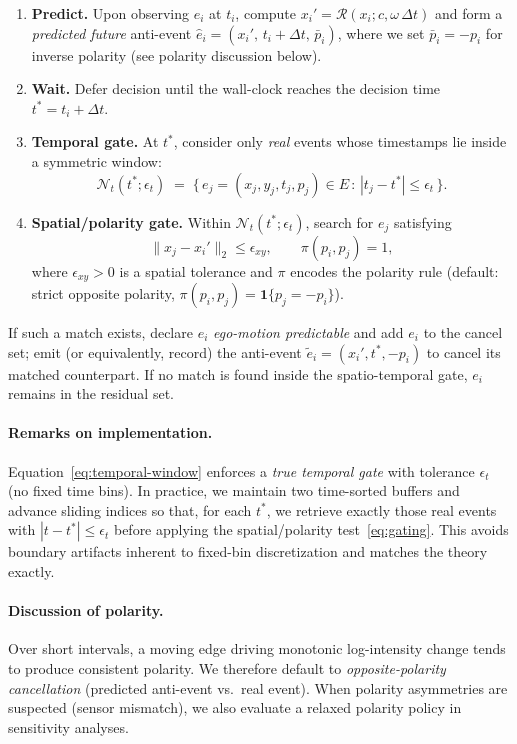 \begin{enumerate}
  \item \textbf{Predict.} Upon observing $e_i$ at $t_i$, compute $x_i'=\mathcal{R}(x_i; c, \omega\,\Delta t)$ and form a \emph{predicted future} anti-event $\hat e_i = (x_i',\, t_i+\Delta t,\, \bar p_i)$, where we set $\bar p_i=-p_i$ for inverse polarity (see polarity discussion below).
  \item \textbf{Wait.} Defer decision until the wall-clock reaches the decision time $t^* = t_i + \Delta t$.
  \item \textbf{Temporal gate.} At $t^*$, consider only \emph{real} events whose timestamps lie inside a symmetric window:
  \begin{equation}
  \mathcal{N}_t(t^*;\epsilon_t) \;=\; \{\, e_j=(x_j,y_j,t_j,p_j)\in E \,:\, |t_j - t^*| \le \epsilon_t \,\}.
  \label{eq:temporal-window}
  \end{equation}
  \item \textbf{Spatial/polarity gate.} Within $\mathcal{N}_t(t^*;\epsilon_t)$, search for $e_j$ satisfying
  \begin{equation}
  \|x_j - x_i'\|_2 \le \epsilon_{xy},
  \qquad
  \pi(p_i,p_j)=1,
  \label{eq:gating}
  \end{equation}
  where $\epsilon_{xy}>0$ is a spatial tolerance and $\pi$ encodes the polarity rule (default: strict opposite polarity, $\pi(p_i,p_j)=\mathbf{1}\{p_j=-p_i\}$).
\end{enumerate}

If such a match exists, declare $e_i$ \emph{ego-motion predictable} and add $e_i$ to the cancel set; emit (or equivalently, record) the anti-event $\tilde e_i=(x_i', t^*, -p_i)$ to cancel its matched counterpart. If no match is found inside the spatio-temporal gate, $e_i$ remains in the residual set.

\paragraph{Remarks on implementation.}
Equation~\eqref{eq:temporal-window} enforces a \emph{true temporal gate} with tolerance $\epsilon_t$ (no fixed time bins). In practice, we maintain two time-sorted buffers and advance sliding indices so that, for each $t^*$, we retrieve exactly those real events with $|t - t^*| \le \epsilon_t$ before applying the spatial/polarity test~\eqref{eq:gating}. This avoids boundary artifacts inherent to fixed-bin discretization and matches the theory exactly.

\paragraph{Discussion of polarity.}
Over short intervals, a moving edge driving monotonic log-intensity change tends to produce consistent polarity. We therefore default to \emph{opposite-pol\-arity cancellation} (predicted anti-event vs.\ real event). When polarity asymmetries are suspected (sensor mismatch), we also evaluate a relaxed polarity policy in sensitivity analyses.

